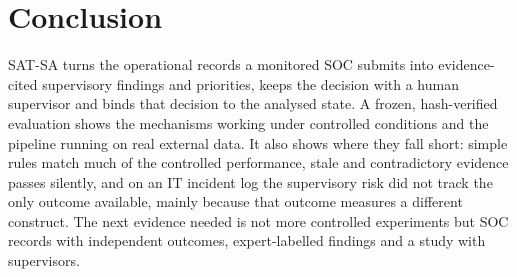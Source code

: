 \section{Conclusion}
\label{sec:conclusion}

SAT-SA turns the operational records a monitored SOC submits into evidence-cited
supervisory findings and priorities, keeps the decision with a human supervisor and
binds that decision to the analysed state. A frozen, hash-verified evaluation shows
the mechanisms working under controlled conditions and the pipeline running on real
external data. It also shows where they fall short: simple rules match much of the
controlled performance, stale and contradictory evidence passes silently, and on an
IT incident log the supervisory risk did not track the only outcome available,
mainly because that outcome measures a different construct. The next evidence
needed is not more controlled experiments but SOC records with independent outcomes,
expert-labelled findings and a study with supervisors.
